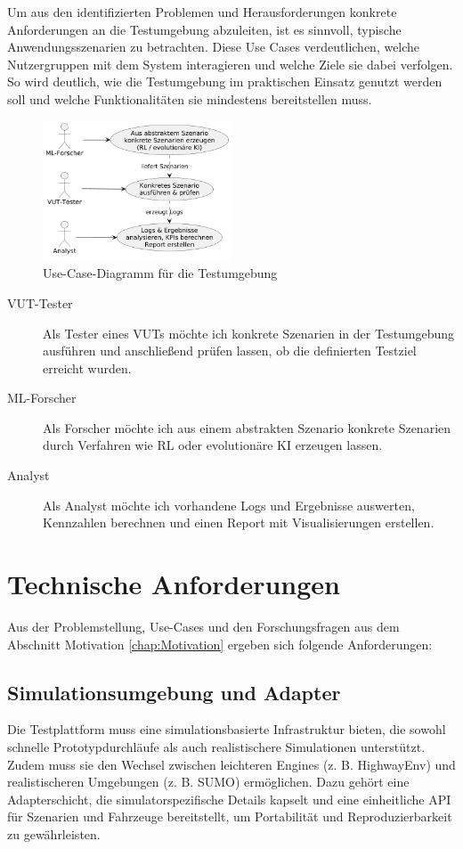 Um aus den identifizierten Problemen und Herausforderungen konkrete Anforderungen an die Testumgebung abzuleiten, ist es sinnvoll, typische Anwendungsszenarien zu betrachten. Diese Use Cases verdeutlichen, welche Nutzergruppen mit dem System interagieren und welche Ziele sie dabei verfolgen. So wird deutlich, wie die Testumgebung im praktischen Einsatz genutzt werden soll und welche Funktionalitäten sie mindestens bereitstellen muss.

\begin{figure}[h]
    \centering
    \includegraphics[width=0.5\textwidth]{contents/figures/UseCaseDiagramm_InteProjekt.png}
    \caption{Use-Case-Diagramm für die Testumgebung}
    \label{fig:UseCaseDiagramm}
\end{figure}


\begin{description}
    \item[VUT-Tester] Als Tester eines VUTs möchte ich konkrete Szenarien in der Testumgebung ausführen und anschließend prüfen lassen, ob die definierten Testziel erreicht wurden.
    \item[ML-Forscher] Als Forscher möchte ich aus einem abstrakten Szenario konkrete Szenarien durch Verfahren wie RL oder evolutionäre KI erzeugen lassen.
    \item[Analyst] Als Analyst möchte ich vorhandene Logs und Ergebnisse auswerten, Kennzahlen berechnen und einen Report mit Visualisierungen erstellen.
\end{description}

\section{Technische Anforderungen}

Aus der Problemstellung, Use-Cases und den Forschungsfragen aus dem Abschnitt Motivation \ref{chap:Motivation} ergeben sich folgende Anforderungen:

\subsection{Simulationsumgebung und Adapter}
Die Testplattform muss eine simulationsbasierte Infrastruktur bieten, die sowohl schnelle Prototypdurchläufe als auch realistischere Simulationen unterstützt. Zudem muss sie den Wechsel zwischen leichteren Engines (z. B. HighwayEnv) und realistischeren Umgebungen (z. B. SUMO) ermöglichen. Dazu gehört eine Adapterschicht, die simulatorspezifische Details kapselt und eine einheitliche API für Szenarien und Fahrzeuge bereitstellt, um Portabilität und Reproduzierbarkeit zu gewährleisten.

